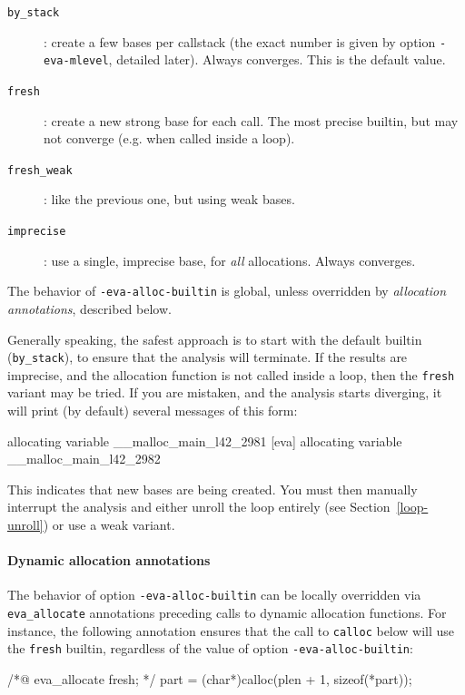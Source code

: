 \documentclass{frama-c-book}
\begin{document}
\begin{description}
\item[\texttt{by\_stack}]: create a few bases per callstack (the exact number
  is given by option \lstinline|-eva-mlevel|, detailed later).
  Always converges. This is the default value.
\item[\texttt{fresh}]: create a new strong base for each call. The most
  precise builtin, but may not converge (e.g. when called inside a loop).
\item[\texttt{fresh\_weak}]: like the previous one, but using weak bases.
\item[\texttt{imprecise}]: use a single, imprecise base, for {\em all}
  allocations. Always converges.
\end{description}

The behavior of \lstinline|-eva-alloc-builtin| is global, unless overridden by
{\em allocation annotations}, described below.

Generally speaking, the safest approach is to start with the default builtin
(\texttt{by\_stack}), to ensure that the analysis will terminate.
If the results are imprecise, and the allocation function is not called inside
a loop, then the \texttt{fresh} variant may be tried. If you are mistaken, and the
analysis starts diverging, it will print (by default) several messages of this
form:

\begin{listing-nonumber}
[eva] allocating variable __malloc_main_l42_2981
[eva] allocating variable __malloc_main_l42_2982
\end{listing-nonumber}

This indicates that new bases are being created.
You must then manually interrupt the analysis and either unroll the loop
entirely (see Section~\ref{loop-unroll}) or use a weak variant.

\paragraph{Dynamic allocation annotations}

The behavior of option \lstinline|-eva-alloc-builtin| can be locally overridden
via \lstinline|eva_allocate| annotations preceding calls to dynamic allocation
functions.
For instance, the following annotation ensures that the call to
\lstinline|calloc| below will use the \lstinline|fresh| builtin,
regardless of the value of option \lstinline|-eva-alloc-builtin|:

\begin{listing-nonumber}
  /*@ eva_allocate fresh; */
  part = (char*)calloc(plen + 1, sizeof(*part));
\end{listing-nonumber}
\end{document}
